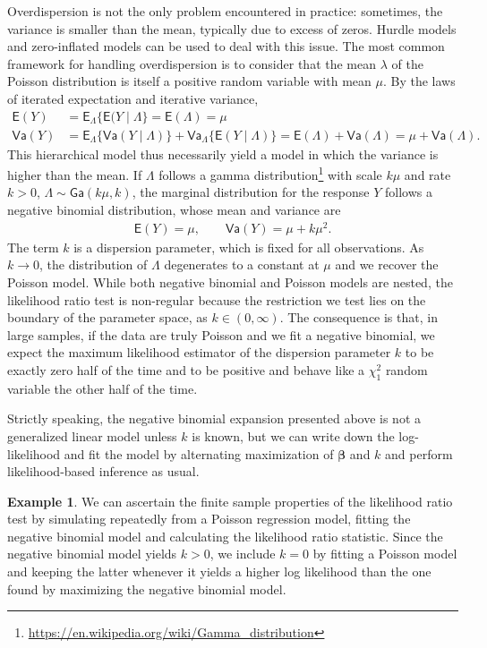 \documentclass[
  11pt,
  letterpaper,
]{book}
\renewcommand{\href}[2]{#2\footnote{\url{#1}}}
\theoremstyle{definition}
\theoremstyle{definition}
\newtheorem{example}{Example}[chapter]
\theoremstyle{definition}
\theoremstyle{definition}
\theoremstyle{remark}
\begin{document}
Overdispersion is not the only problem encountered in practice: sometimes, the variance is smaller than the mean, typically due to excess of zeros. Hurdle models and zero-inflated models can be used to deal with this issue. The most common framework for handling overdispersion is to consider that the mean \(\lambda\) of the Poisson distribution is itself a positive random variable with mean \(\mu\). By the laws of iterated expectation and iterative variance,
\begin{align*}
\mathsf{E}(Y) &= \mathsf{E}_{\Lambda}\{\mathsf{E}(Y \mid \Lambda\} = \mathsf{E}(\Lambda) = \mu\\
\mathsf{Va}(Y) &= \mathsf{E}_{\Lambda}\{\mathsf{Va}(Y \mid \Lambda)\} + \mathsf{Va}_{\Lambda}\{\mathsf{E}(Y \mid \Lambda)\} = \mathsf{E}(\Lambda) + \mathsf{Va}(\Lambda) = \mu + \mathsf{Va}(\Lambda).
\end{align*}
This hierarchical model thus necessarily yield a model in which the variance is higher than the mean. If \(\Lambda\) follows a \href{https://en.wikipedia.org/wiki/Gamma_distribution}{gamma distribution} with scale \(k\mu\) and rate \(k>0\), \(\Lambda \sim \mathsf{Ga}(k\mu, k)\), the marginal distribution for the response \(Y\) follows a negative binomial distribution, whose mean and variance are
\begin{align*}
\mathsf{E}(Y) = \mu, \qquad \mathsf{Va}(Y) = \mu + k \mu^2.
\end{align*}
The term \(k\) is a dispersion parameter, which is fixed for all observations. As \(k \to 0\), the distribution of \(\Lambda\) degenerates to a constant at \(\mu\) and we recover the Poisson model. While both negative binomial and Poisson models are nested, the likelihood ratio test is non-regular because the restriction we test lies on the boundary of the parameter space, as \(k \in (0, \infty)\). The consequence is that, in large samples, if the data are truly Poisson and we fit a negative binomial, we expect the maximum likelihood estimator of the dispersion parameter \(k\) to be exactly zero half of the time and
to be positive and behave like a \(\chi_1^2\) random variable the other half of the time.

Strictly speaking, the negative binomial expansion presented above is not a generalized linear model unless \(k\) is known, but we can write down the log-likelihood and fit the model by alternating maximization of \(\boldsymbol{\beta}\) and \(k\) and perform likelihood-based inference as usual.

\begin{example}
\protect\hypertarget{exm:unnamed-chunk-2}{}\label{exm:unnamed-chunk-2}We can ascertain the finite sample properties of the likelihood ratio test by simulating repeatedly from a Poisson regression model, fitting the negative binomial model and calculating the likelihood ratio statistic. Since the negative binomial model yields \(k>0\), we include \(k=0\) by fitting a Poisson model and keeping the latter whenever it yields a higher log likelihood than the one found by maximizing the negative binomial model.
\end{example}
\end{document}
